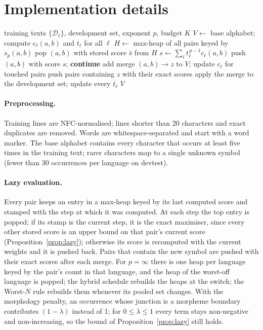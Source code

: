 \section{Implementation details}
\label{app:impl}

\begin{algorithm}[h]
\caption{$p$-fair BPE training with lazy evaluation.}
\label{alg:pfair}
\small
\begin{algorithmic}[1]
\Require training texts $\{\mathcal{D}_\ell\}$, development set, exponent $p$, budget $K$
\State $V \gets$ base alphabet; compute $c_\ell(a,b)$ and $t_\ell$ for all $\ell$
\State $H \gets$ max-heap of all pairs keyed by $s_p(a,b)$
  \State pop $(a,b)$ with stored score $\hat s$ from $H$
  \State $s \gets \sum_\ell t_\ell^{\,p-1} c_\ell(a,b)$ 
    \State push $(a,b)$ with score $s$; \textbf{continue}
  \EndIf
  \State add merge $(a,b)\to z$ to $V$; update $c_\ell$ for touched pairs
  \State push pairs containing $z$ with their exact scores
  \State apply the merge to the development set; update every $t_\ell$
\EndWhile
\State \Return $V$
\end{algorithmic}
\end{algorithm}

\paragraph{Preprocessing.}
Training lines are NFC-normalised; lines shorter than 20 characters and exact duplicates
are removed. Words are whitespace-separated and start with a word marker. The base alphabet
contains every character that occurs at least five times in the training text; rarer
characters map to a single unknown symbol (fewer than 30 occurrences per language on
devtest).

\paragraph{Lazy evaluation.}
Every pair keeps an entry in a max-heap keyed by its last computed score and stamped with
the step at which it was computed. At each step the top entry is popped; if its stamp is the
current step, it is the exact maximiser, since every other stored score is an upper bound on
that pair's current score (Proposition~\ref{prop:lazy}); otherwise its score is recomputed
with the current weights and it is pushed back. Pairs that contain the new symbol are
pushed with their exact scores after each merge. For $p=\infty$ there is one heap per
language keyed by the pair's count in that language, and the heap of the worst-off language
is popped; the hybrid schedule rebuilds the heaps at the switch; the Worst-$N$ rule rebuilds
them whenever its pooled set changes. With the morphology penalty, an occurrence whose
junction is a morpheme boundary contributes $(1-\lambda)$ instead of 1; for
$0\le\lambda\le1$ every term stays non-negative and non-increasing, so the bound of
Proposition~\ref{prop:lazy} still holds.

